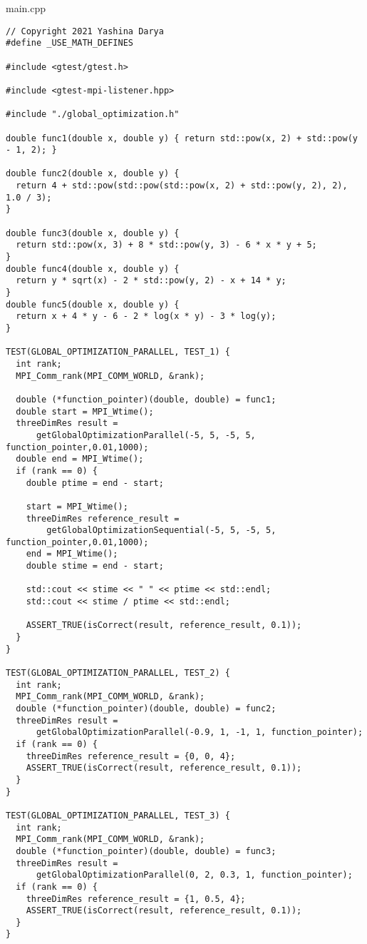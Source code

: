 \documentclass{report}
\begin{document}
main.cpp
\begin{lstlisting}
// Copyright 2021 Yashina Darya
#define _USE_MATH_DEFINES

#include <gtest/gtest.h>

#include <gtest-mpi-listener.hpp>

#include "./global_optimization.h"

double func1(double x, double y) { return std::pow(x, 2) + std::pow(y - 1, 2); }

double func2(double x, double y) {
  return 4 + std::pow(std::pow(std::pow(x, 2) + std::pow(y, 2), 2), 1.0 / 3);
}

double func3(double x, double y) {
  return std::pow(x, 3) + 8 * std::pow(y, 3) - 6 * x * y + 5;
}
double func4(double x, double y) {
  return y * sqrt(x) - 2 * std::pow(y, 2) - x + 14 * y;
}
double func5(double x, double y) {
  return x + 4 * y - 6 - 2 * log(x * y) - 3 * log(y);
}

TEST(GLOBAL_OPTIMIZATION_PARALLEL, TEST_1) {
  int rank;
  MPI_Comm_rank(MPI_COMM_WORLD, &rank);

  double (*function_pointer)(double, double) = func1;
  double start = MPI_Wtime();
  threeDimRes result =
      getGlobalOptimizationParallel(-5, 5, -5, 5, function_pointer,0.01,1000);
  double end = MPI_Wtime();
  if (rank == 0) {
    double ptime = end - start;

    start = MPI_Wtime();
    threeDimRes reference_result =
        getGlobalOptimizationSequential(-5, 5, -5, 5, function_pointer,0.01,1000);
    end = MPI_Wtime();
    double stime = end - start;

    std::cout << stime << " " << ptime << std::endl;
    std::cout << stime / ptime << std::endl;

    ASSERT_TRUE(isCorrect(result, reference_result, 0.1));
  }
}

TEST(GLOBAL_OPTIMIZATION_PARALLEL, TEST_2) {
  int rank;
  MPI_Comm_rank(MPI_COMM_WORLD, &rank);
  double (*function_pointer)(double, double) = func2;
  threeDimRes result =
      getGlobalOptimizationParallel(-0.9, 1, -1, 1, function_pointer);
  if (rank == 0) {
    threeDimRes reference_result = {0, 0, 4};
    ASSERT_TRUE(isCorrect(result, reference_result, 0.1));
  }
}

TEST(GLOBAL_OPTIMIZATION_PARALLEL, TEST_3) {
  int rank;
  MPI_Comm_rank(MPI_COMM_WORLD, &rank);
  double (*function_pointer)(double, double) = func3;
  threeDimRes result =
      getGlobalOptimizationParallel(0, 2, 0.3, 1, function_pointer);
  if (rank == 0) {
    threeDimRes reference_result = {1, 0.5, 4};
    ASSERT_TRUE(isCorrect(result, reference_result, 0.1));
  }
}


\end{lstlisting}
\end{document}
